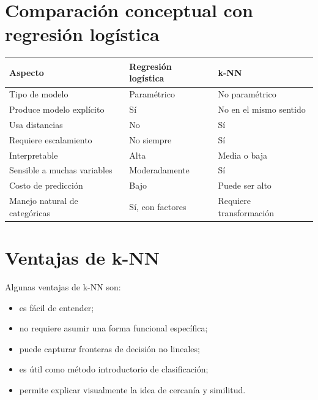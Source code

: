 \documentclass[
  11pt,
  letterpaper,
]{book}
\newcounter{none} %
\providecommand{\tightlist}{%
  \setlength{\itemsep}{0pt}\setlength{\parskip}{0pt}}
\begin{document}
\section{Comparación conceptual con regresión
logística}\label{comparaciuxf3n-conceptual-con-regresiuxf3n-loguxedstica}

{\def\LTcaptype{none} %
\begin{longtable}[]{@{}
  >{\raggedright\arraybackslash}p{}
  >{\raggedright\arraybackslash}p{}
  >{\raggedright\arraybackslash}p{}@{}}
\toprule\noalign{}
\begin{minipage}[b]{\linewidth}\raggedright
Aspecto
\end{minipage} & \begin{minipage}[b]{\linewidth}\raggedright
Regresión logística
\end{minipage} & \begin{minipage}[b]{\linewidth}\raggedright
k-NN
\end{minipage} \\
\midrule\noalign{}
\endhead
\bottomrule\noalign{}
\endlastfoot
Tipo de modelo & Paramétrico & No paramétrico \\
Produce modelo explícito & Sí & No en el mismo sentido \\
Usa distancias & No & Sí \\
Requiere escalamiento & No siempre & Sí \\
Interpretable & Alta & Media o baja \\
Sensible a muchas variables & Moderadamente & Sí \\
Costo de predicción & Bajo & Puede ser alto \\
Manejo natural de categóricas & Sí, con factores & Requiere
transformación \\
\end{longtable}
}

\section{Ventajas de k-NN}\label{ventajas-de-k-nn}

Algunas ventajas de k-NN son:

\begin{itemize}
\tightlist
\item
  es fácil de entender;
\item
  no requiere asumir una forma funcional específica;
\item
  puede capturar fronteras de decisión no lineales;
\item
  es útil como método introductorio de clasificación;
\item
  permite explicar visualmente la idea de cercanía y similitud.
\end{itemize}
\end{document}
